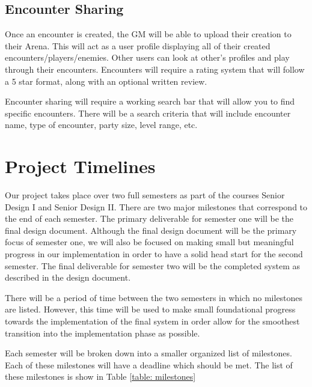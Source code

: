 \documentclass[12pt,a4paper]{report}
\begin{document}
		\subsection{Encounter Sharing}
		Once an encounter is created, the GM will be able to upload their creation to their Arena. This will act as a user profile displaying all of their created encounters/players/enemies. Other users can look at other's profiles and play through their encounters. Encounters will require a rating system that will follow a 5 star format, along with an optional written review.
		
		Encounter sharing will require a working search bar that will allow you to find specific encounters. There will be a search criteria that will include encounter name, type of encounter, party size, level range, etc.
	\section{Project Timelines}
	Our project takes place over two full semesters as part of the courses Senior Design I and Senior Design II. There are two major milestones that correspond to the end of each semester. The primary deliverable for semester one will be the final design document. Although the final design document will be the primary focus of semester one, we will also be focused on making small but meaningful progress in our implementation in order to have a solid head start for the second semester. The final deliverable for semester two will be the completed system as described in the design document. 
	
	There will be a period of time between the two semesters in which no milestones are listed. However, this time will be used to make small foundational progress towards the implementation of the final system in order allow for the smoothest transition into the implementation phase as possible. 
	
	Each semester will be broken down into a smaller organized list of milestones. Each of these milestones will have a deadline which should be met. The list of these milestones is show in Table \ref{table: milestones}
	
\end{document}
